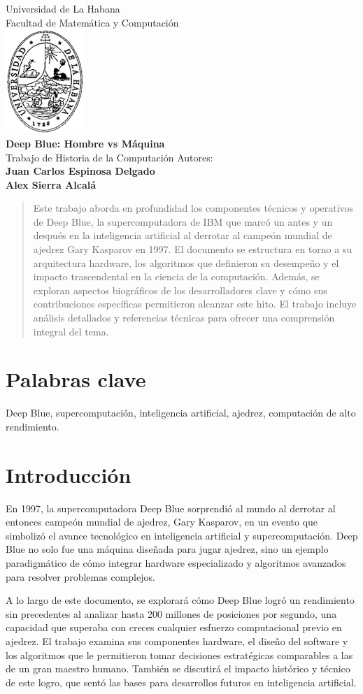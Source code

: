 \documentclass[12pt,a4paper]{article}
\date{Diciembre 2024}
\def\maketitle{%
  \thispagestyle{empty}%
  \begin{center}
    \vskip 3cm
    {\large Universidad de La Habana} \\ Facultad de Matemática y Computación \\ 
    \vskip 0.25cm
    \includegraphics[width=3cm]{uh.png} \\
    \vskip 2cm
    {\LARGE \textbf{\textbf{Deep Blue: Hombre vs Máquina}}} \\
    \vskip 0.25cm
    {\large Trabajo de Historia de la Computación}
    \vskip 2cm
    {\Large Autores:\\ \textbf{Juan Carlos Espinosa Delgado \\ Alex Sierra Alcalá}} \\
    \vfill
    \date{Diciembre 2024}
  \end{center}
}
\begin{document}
\maketitle

\begin{titlepage}
    \centering
    \begin{abstract}
        Este trabajo aborda en profundidad los componentes técnicos y operativos de Deep Blue, la supercomputadora de IBM que marcó un antes y un después en la inteligencia artificial al derrotar al campeón mundial de ajedrez Gary Kasparov en 1997. El documento se estructura en torno a su arquitectura hardware, los algoritmos que definieron su desempeño y el impacto trascendental en la ciencia de la computación. Además, se exploran aspectos biográficos de los desarrolladores clave y cómo sus contribuciones específicas permitieron alcanzar este hito. El trabajo incluye análisis detallados y referencias técnicas para ofrecer una comprensión integral del tema.
    \end{abstract}
    \section*{Palabras clave}
    Deep Blue, supercomputación, inteligencia artificial, ajedrez, computación de alto rendimiento.
\end{titlepage}


\newpage
\tableofcontents
\newpage

\section{Introducción}
En 1997, la supercomputadora Deep Blue sorprendió al mundo al derrotar al entonces campeón mundial de ajedrez, Gary Kasparov, en un evento que simbolizó el avance tecnológico en inteligencia artificial y supercomputación. Deep Blue no solo fue una máquina diseñada para jugar ajedrez, sino un ejemplo paradigmático de cómo integrar hardware especializado y algoritmos avanzados para resolver problemas complejos. 

A lo largo de este documento, se explorará cómo Deep Blue logró un rendimiento sin precedentes al analizar hasta 200 millones de posiciones por segundo, una capacidad que superaba con creces cualquier esfuerzo computacional previo en ajedrez. El trabajo examina sus componentes hardware, el diseño del software y los algoritmos que le permitieron tomar decisiones estratégicas comparables a las de un gran maestro humano. También se discutirá el impacto histórico y técnico de este logro, que sentó las bases para desarrollos futuros en inteligencia artificial.
\end{document}
